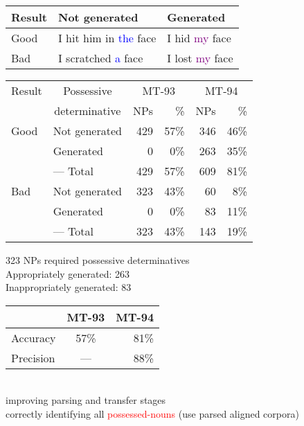\documentclass[a4paper,landscape,headrule,footrule,xetex]{foils}
\newcommand{\psp}[1]{\textcolor{purple}{#1}}
\newcommand{\dtr}[1]{\textcolor{blue}{#1}}
\newcommand{\trg}[1]{\textcolor{red}{#1}}
\newcommand{\hsp}{\hspace*{1.5cm}}
\newcommand{\hhsp}{\hspace*{2.5cm}}
\begin{document}
  \begin{center}
    \begin{tabular}{|l|l|l|} \hline
      Result & Not generated & Generated  \\ \hline
      Good &I hit him in \dtr{the} face  &  I hid \psp{my} face \\ \hline
      Bad &  I scratched \dtr{a} face       & I lost \psp{my} face \\ \hline
    \end{tabular}

    \begin{tabular}{|l|l|rr|rr|} \hline
      Result & \multicolumn{1}{c|}{Possessive}  &
      \multicolumn{2}{c|}{MT-93} & \multicolumn{2}{c|}{MT-94}\\ 
      & \multicolumn{1}{c|}{determinative}     & NPs & \%& NPs & \% \\ \hline
      Good & Not generated & 429 & 57\% & 346  & 46\%\\
      & Generated     &   0 & 0\%  & 263  & 35\%\\ \cline{2-6}
      & --- Total & 429 &  57\% & 609 & 81\%  \\ \hline
      Bad  & Not generated & 323 & 43\% &  60 & 8\% \\
      & Generated     &   0 & 0\%  &  83 & 11\% \\ \cline{2-6}
      & --- Total     &  323 & 43\% & 143 & 19\%  \\  \hline 
    \end{tabular}
  \end{center}


323 NPs required possessive determinatives \\
\hsp Appropriately generated: 263 \\
\hsp Inappropriately generated: 83

\hhsp \begin{tabular}{|l|c|r|} \hline
& \multicolumn{1}{c|}{MT-93} & \multicolumn{1}{c|}{MT-94}\\ \hline
Accuracy &  57\% &  81\% \\ \hline
Precision & --- &  88\% \\ \hline
\end{tabular}

 \\
\hsp improving parsing and transfer stages \\
\hsp correctly identifying all \trg{possessed-nouns} (use parsed aligned corpora)
\end{document}
